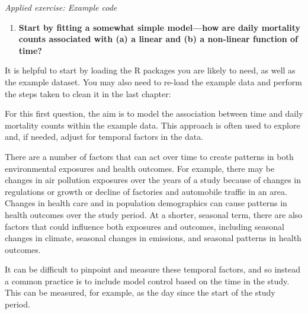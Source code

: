 \documentclass[
]{book}
\newenvironment{Shaded}{\begin{snugshade}}{\end{snugshade}}
\newcommand{\CommentTok}[1]{\textcolor[rgb]{0.56,0.35,0.01}{\textit{#1}}}
\newcommand{\DataTypeTok}[1]{\textcolor[rgb]{0.13,0.29,0.53}{#1}}
\newcommand{\KeywordTok}[1]{\textcolor[rgb]{0.13,0.29,0.53}{\textbf{#1}}}
\newcommand{\NormalTok}[1]{#1}
\newcommand{\OperatorTok}[1]{\textcolor[rgb]{0.81,0.36,0.00}{\textbf{#1}}}
\newcommand{\OtherTok}[1]{\textcolor[rgb]{0.56,0.35,0.01}{#1}}
\newcommand{\StringTok}[1]{\textcolor[rgb]{0.31,0.60,0.02}{#1}}
\providecommand{\tightlist}{%
  \setlength{\itemsep}{0pt}\setlength{\parskip}{0pt}}
\begin{document}
\emph{Applied exercise: Example code}

\begin{enumerate}
\def\labelenumi{\arabic{enumi}.}
\tightlist
\item
  \textbf{Start by fitting a somewhat simple model---how are daily mortality counts
  associated with (a) a linear and (b) a non-linear function of time?}
\end{enumerate}

It is helpful to start by loading the R packages you are likely to need, as
well as the example dataset. You may also need to re-load the example data
and perform the steps taken to clean it in the last chapter:

\begin{Shaded}
\end{Shaded}

For this first question, the aim is to model the association between time and
daily mortality counts within the example data. This approach is often used
to explore and, if needed, adjust for temporal factors in the data.

There are a number of factors that can act over time to create patterns in both
environmental exposures and health outcomes. For example, there may be changes
in air pollution exposures over the years of a study because of changes in
regulations or growth or decline of factories and automobile traffic in an area.
Changes in health care and in population demographics can cause patterns in
health outcomes over the study period. At a shorter, seasonal term, there are
also factors that could influence both exposures and outcomes, including
seasonal changes in climate, seasonal changes in emissions, and seasonal
patterns in health outcomes.

It can be difficult to pinpoint and measure these temporal factors, and so
instead a common practice is to include model control based on the time in the
study. This can be measured, for example, as the day since the start of the
study period.
\end{document}
